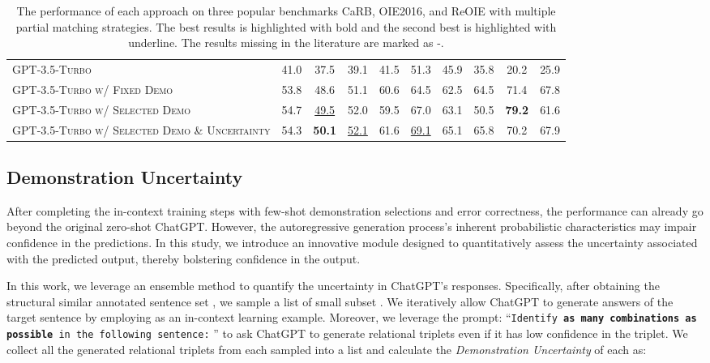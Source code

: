 \documentclass{article}
\begin{document}
\begin{table*}[t]
{\begin{tabular}{@{}lccccccccc@{}}
\midrule
\textsc{GPT-3.5-Turbo}                                 & 41.0   & 37.5   & 39.1  & 41.5    & 51.3   & 45.9   & 35.8          & 20.2          & 25.9          \\
\textsc{GPT-3.5-Turbo w/ Fixed Demo}                   & 53.8   & 48.6   & 51.1   & 60.6    & 64.5   & 62.5   & 64.5          & 71.4          & 67.8          \\
\textsc{GPT-3.5-Turbo w/ Selected Demo}                & 54.7   & \underline{49.5}   & 52.0   & 59.5    & 67.0   & 63.1   & 50.5          & \textbf{79.2} & 61.6          \\
\textsc{GPT-3.5-Turbo w/ Selected Demo \& Uncertainty} & 54.3   & \textbf{50.1}   & \underline{52.1}   & 61.6    & \underline{69.1}   & 65.1   &       65.8        &       70.2        &         67.9      \\ \bottomrule
\end{tabular}}\vspace{-3mm}
\caption{The performance of each approach on three popular benchmarks CaRB, OIE2016, and ReOIE with multiple partial matching strategies. The best results is highlighted with bold and the second best is highlighted with underline. The results missing in the literature are marked as -.}
\vspace{-3mm}
\label{tab:my-table}
\end{table*}

\subsection{Demonstration Uncertainty}\label{sec:demo}
After completing the in-context training steps with few-shot demonstration selections and error correctness, the performance can already go beyond the original zero-shot ChatGPT. However, the autoregressive generation process's inherent probabilistic characteristics may impair confidence in the predictions. In this study, we introduce an innovative module designed to quantitatively assess the uncertainty associated with the predicted output, thereby bolstering confidence in the  output.

In this work, we leverage an ensemble method to quantify the uncertainty in ChatGPT's responses. Specifically, after obtaining the structural similar annotated sentence set , we sample a list of small subset . We iteratively allow ChatGPT to generate answers of the target sentence  by employing  as an in-context learning example. Moreover, we leverage the prompt: ``\texttt{Identify \textbf{as many combinations as possible} in the following sentence:} '' to ask ChatGPT to generate relational triplets even if it has low confidence in the triplet. We collect all the generated relational triplets from each sampled  into a list  and calculate the \textit{Demonstration Uncertainty}  of each  as:
\end{document}
